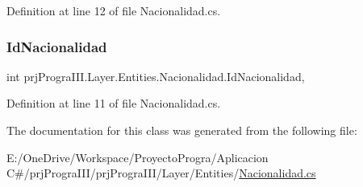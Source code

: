 Definition at line 12 of file Nacionalidad.\+cs.

\hypertarget{classprj_progra_i_i_i_1_1_layer_1_1_entities_1_1_nacionalidad_afc3f8d07b30d81d80ed29b7577264dc6}{}\label{classprj_progra_i_i_i_1_1_layer_1_1_entities_1_1_nacionalidad_afc3f8d07b30d81d80ed29b7577264dc6} 
\subsubsection{\texorpdfstring{Id\+Nacionalidad}{IdNacionalidad}}
{\footnotesize\ttfamily int prj\+Progra\+I\+I\+I.\+Layer.\+Entities.\+Nacionalidad.\+Id\+Nacionalidad\hspace{0.3cm}{\ttfamily [get]}, {\ttfamily [set]}}



Definition at line 11 of file Nacionalidad.\+cs.



The documentation for this class was generated from the following file\+:\begin{DoxyCompactItemize}
\item 
E\+:/\+One\+Drive/\+Workspace/\+Proyecto\+Progra/\+Aplicacion C\#/prj\+Progra\+I\+I\+I/prj\+Progra\+I\+I\+I/\+Layer/\+Entities/\hyperlink{_nacionalidad_8cs}{Nacionalidad.\+cs}\end{DoxyCompactItemize}
